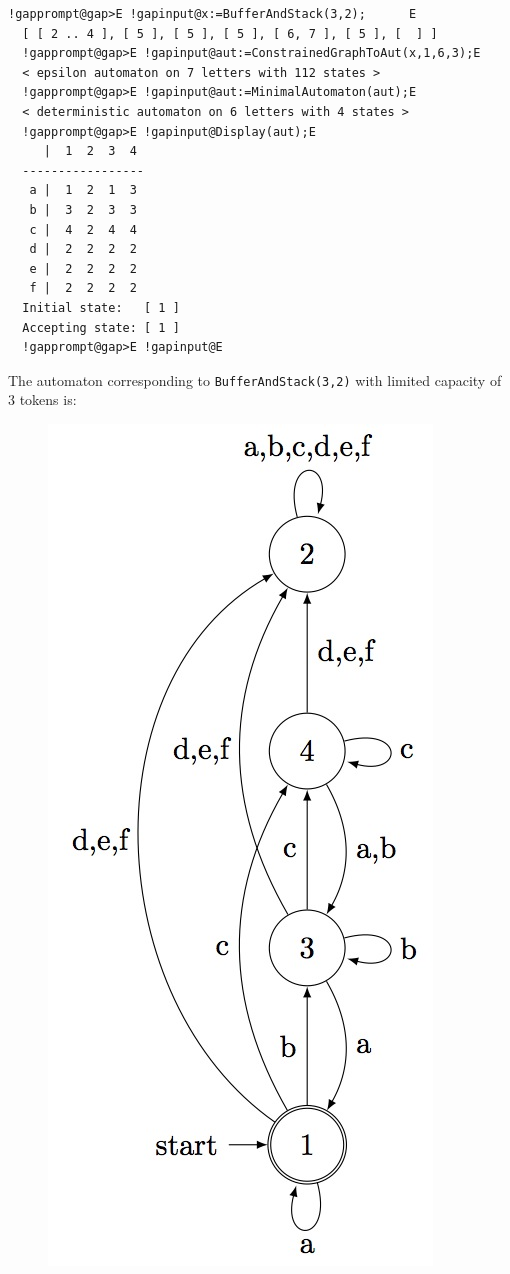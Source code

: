 \documentclass[a4paper,11pt]{report}
\begin{document}
{{{\begin{Verbatim}[commandchars=!@E,fontsize=\small,frame=single,label=Example]
  !gapprompt@gap>E !gapinput@x:=BufferAndStack(3,2);      E
  [ [ 2 .. 4 ], [ 5 ], [ 5 ], [ 5 ], [ 6, 7 ], [ 5 ], [  ] ]
  !gapprompt@gap>E !gapinput@aut:=ConstrainedGraphToAut(x,1,6,3);E
  < epsilon automaton on 7 letters with 112 states >
  !gapprompt@gap>E !gapinput@aut:=MinimalAutomaton(aut);E
  < deterministic automaton on 6 letters with 4 states >
  !gapprompt@gap>E !gapinput@Display(aut);E
     |  1  2  3  4  
  -----------------
   a |  1  2  1  3  
   b |  3  2  3  3  
   c |  4  2  4  4  
   d |  2  2  2  2  
   e |  2  2  2  2  
   f |  2  2  2  2  
  Initial state:   [ 1 ]
  Accepting state: [ 1 ]
  !gapprompt@gap>E !gapinput@E
\end{Verbatim}
 
      The automaton corresponding to \texttt{BufferAndStack(3,2)} with limited capacity of 3 tokens is:
      \begin{figure}[H] \begin{center} \leavevmode \includegraphics[scale=0.75]{img/bs32c3aut.jpg} \end{center} \end{figure}
      
}}}
\end{document}
